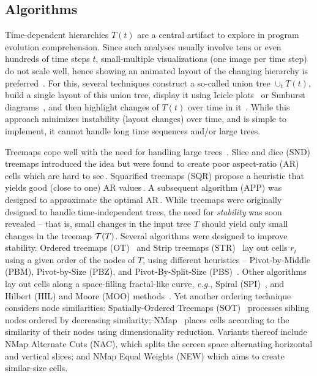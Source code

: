 \subsection{Algorithms}
\label{sec:algorithms}
%
Time-dependent hierarchies $T(t)$ are a central artifact to explore in program evolution comprehension. Since such analyses usually involve tens or even hundreds of time steps $t$, small-multiple visualizations (one image per time step) do not scale well, hence showing an animated layout of the changing hierarchy is preferred~\cite{diehl08}. For this, several techniques construct a so-called union tree $\cup_tT(t)$, build a single layout of this union tree, display it using Icicle plots~\cite{Kruskal1983} or Sunburst diagrams~\cite{sunburst}, and then highlight changes of $T(t)$ over time in it~\cite{ersoy_sequence}. While this approach minimizes instability (layout changes) over time, and is simple to implement, it cannot handle long time sequences and/or large trees.

Treemaps cope well with the need for handling large trees~\cite{schulz11_treesurvey,hci_treemaps,treevis,landesberger11}.  Slice and dice (SND) treemaps introduced the idea but were found to create poor aspect-ratio (AR) cells which are hard to see\,\cite{shneiderman92}. Squarified treemaps (SQR) propose a heuristic that yields good (close to one) AR values\,\cite{sqr}. A subsequent algorithm (APP) was designed to approximate the optimal AR\,\cite{nagamochi07}. While treemaps were originally designed to handle time-independent trees, the need for \emph{stability} was soon revealed -- that is, small changes in the input tree $T$ should yield only small changes in the treemap ${\cal T}(T)$.
Several algorithms were designed to improve stability. Ordered treemaps (OT)~\cite{ordered} and Strip treemaps (STR)~\cite{bederson02} lay out cells $r_i$ using a given order of the nodes of $T$, using different heuristics -- Pivot-by-Middle (PBM), Pivot-by-Size (PBZ), and Pivot-By-Split-Size (PBS)~\cite{ordered}. Other algorithms lay out cells along a space-filling fractal-like curve, \emph{e.g.}, Spiral (SPI)~\cite{spiral}, and Hilbert (HIL) and Moore (MOO) methods~\cite{hilbert_moore}. Yet another ordering technique considers node similarities: Spatially-Ordered Treemaps (SOT)~\cite{sot} processes sibling nodes ordered by decreasing similarity; NMap~\cite{nmap} places cells according to the similarity of their nodes using dimensionality reduction. Variants thereof include NMap Alternate Cuts (NAC), which splits the screen space alternating horizontal and vertical slices; and NMap Equal Weights (NEW) which aims to create similar-size cells.

